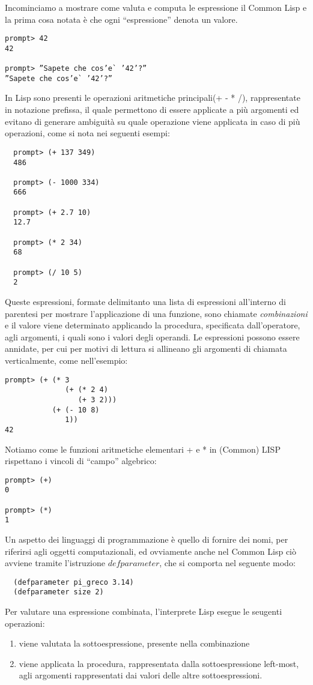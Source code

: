 \documentclass[a4paper]{book}
\begin{document}
Incominciamo a mostrare come valuta e computa le espressione il Common Lisp
e la prima cosa notata è che ogni ``espressione'' denota un valore.
\begin{verbatim}
prompt> 42
42

prompt> ”Sapete che cos’e` ’42’?”
”Sapete che cos’e` ’42’?”
\end{verbatim}
In Lisp sono presenti le operazioni aritmetiche principali(+ - * /), rappresentate in notazione prefissa,
il quale permettono di essere applicate a più argomenti ed evitano di generare ambiguità su quale operazione viene
applicata in caso di più operazioni, come si nota nei seguenti esempi:
\begin{verbatim}
  prompt> (+ 137 349)
  486

  prompt> (- 1000 334)
  666

  prompt> (+ 2.7 10)
  12.7

  prompt> (* 2 34)
  68

  prompt> (/ 10 5)
  2
\end{verbatim}
Queste espressioni, formate delimitanto una lista di espressioni all'interno di parentesi per mostrare l'applicazione di una funzione,
sono chiamate \emph{combinazioni} e il valore viene determinato applicando la procedura, specificata dall'operatore, agli argomenti,
i quali sono i valori degli operandi.
Le espressioni possono essere annidate, per cui per motivi di lettura si allineano gli argomenti di chiamata verticalmente, come nell'esempio:
\begin{verbatim}
prompt> (+ (* 3
              (+ (* 2 4)
                 (+ 3 2)))
           (+ (- 10 8)
              1))
42
\end{verbatim}
Notiamo come le funzioni aritmetiche elementari + e * in (Common) LISP rispettano i vincoli di “campo” algebrico:
\begin{verbatim}
prompt> (+)
0

prompt> (*)
1
\end{verbatim}
Un aspetto dei linguaggi di programmazione è quello di fornire dei nomi, per riferirsi agli oggetti computazionali,
ed ovviamente anche nel Common Lisp ciò avviene tramite l'istruzione $defparameter$, che si comporta nel seguente modo:
\begin{verbatim}
  (defparameter pi_greco 3.14)
  (defparameter size 2)
\end{verbatim}
Per valutare una espressione combinata, l'interprete Lisp esegue le seugenti operazioni:
\begin{enumerate}
\item viene valutata la sottoespressione, presente nella combinazione
\item viene applicata la procedura, rappresentata dalla sottoespressione left-most, agli argomenti
  rappresentati dai valori delle altre sottoespressioni.
\end{enumerate}
\end{document}
